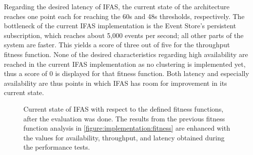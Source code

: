 Regarding the desired latency of \ac{IFAS}, the current state of the architecture reaches one point each for reaching the 60s and 48s thresholds, respectively.
The bottleneck of the current \ac{IFAS} implementation is the Event Store's persistent subscription, which reaches about 5,000 events per second; all other parts of the system are faster.
This yields a score of three out of five for the throughput fitness function.
None of the desired characteristics regarding high availability are reached in the current \ac{IFAS} implementation as no clustering is implemented yet, thus a score of 0 is displayed for that fitness function.
Both latency and especially availability are thus points in which \ac{IFAS} has room for improvement in its current state.

\begin{figure}[t]
        \caption[Current state of \ac{IFAS} with respect to the defined fitness functions, after the evaluation was done.]{
        Current state of \ac{IFAS} with respect to the defined fitness functions, after the evaluation was done.
        The results from the previous fitness function analysis in \cref{figure:implementation:fitness} are enhanced with the values for availability, throughput, and latency obtained during the performance tests.
        }
        \label{figure:evaluation:fitness}
\end{figure}
